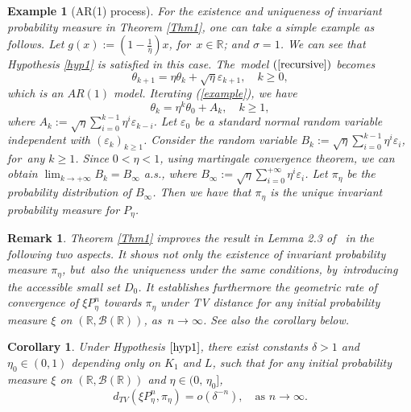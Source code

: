 \documentclass[11pt]{elsarticle}
\newtheorem{corollary}{Corollary}[section]
\newtheorem{example}{Example}[section]
\newtheorem{remark}{Remark}[section]
\def\geq{\geqslant}
\def\R{\mathbb{R}}
\begin{document}
\begin{example}[AR(1) process]
	For the existence and uniqueness of invariant probability measure in Theorem \ref{Thm1}, one can take a simple example as follows. Let $g(x):=\left(1-\frac{1}{\eta}\right) x$, for~$x\in\R$; and $\sigma=1$. We can see that Hypothesis \ref{hyp1} is satisfied in this case. The~model $(\ref{recursive})$ becomes
	\begin{equation}\label{example}
		\theta_{k+1}=\eta\theta_k+\sqrt{\eta}\varepsilon_{k+1},\quad k\geq0,
	\end{equation}
	which is an $AR(1)$ model. Iterating (\ref{example}), we have
	$$\theta_{k}=\eta^k\theta_0+A_k,\quad k\geq1,$$
	where $A_k:=\sqrt{\eta}\sum_{i=0}^{k-1}\eta^i\varepsilon_{k-i}$. Let $\varepsilon_0$ be a standard normal random variable independent with $(\varepsilon_k)_{k\geq1}$. Consider the random variable $B_k:=\sqrt{\eta}\sum_{i=0}^{k-1}\eta^i\varepsilon_i$, for~any $k\geq1$. Since $0<\eta<1$, using martingale convergence theorem, we can obtain $\lim_{k\rightarrow+\infty}B_k=B_{\infty}$ a.s., where $B_\infty:=\sqrt{\eta}\sum_{i=0}^{+\infty}\eta^i\varepsilon_i$. Let $\pi_\eta$ be the probability distribution of $B_{\infty}$. Then we have that $\pi_\eta$ is the unique invariant probability measure for $P_\eta$.
\end{example}

\begin{remark}
	Theorem \ref{Thm1} improves the result in Lemma 2.3 of~\cite{LTX22} in the following two aspects. It shows not only the existence of invariant probability measure $\pi_{\eta}$, but~also the uniqueness under the same conditions, by~introducing the accessible small set $D_0$. It establishes furthermore the geometric rate of convergence of $\xi P_{\eta}^n$ towards $\pi_{\eta}$ under TV distance for any initial probability measure $\xi$ on $(\R,\mathcal{B}(\R))$, as~$n\rightarrow\infty$. See also the corollary below.
\end{remark}

\begin{corollary}\label{cor}
	Under Hypothesis $\ref{hyp1}$, there exist constants $\delta>1$ and $\eta_{0}\in(0,1)$ depending only on $K_1$ and $L$, such that for any initial probability measure $\xi$ on $(\R,\mathcal{B}(\R))$ and $\eta\in (0,\,\eta_{0}]$,
	\begin{equation*}
		d_{TV}\left(\xi P_{\eta}^n,\pi_\eta\right)=o\left(\delta^{-n}\right),\quad\text{as }n\rightarrow\infty.
	\end{equation*}
\end{corollary}
\end{document}
